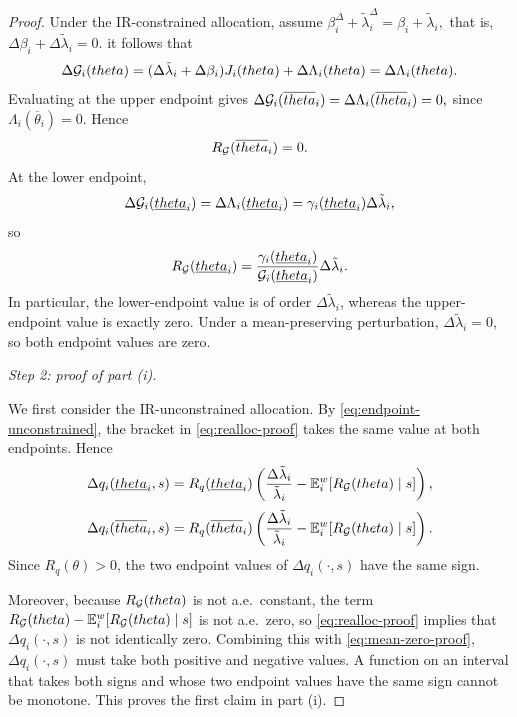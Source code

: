 \documentclass{class}
\begin{document}
\begin{proof}
Under the IR-constrained allocation, assume
$\beta_i^\Delta+\tilde\lambda_i^\Delta=\beta_i+\tilde\lambda_i,$
that is,
$\Delta\beta_i+\Delta\tilde\lambda_i=0.$
it follows that
\[
\Delta\mathcal{G}_i(theta)
=
(\Delta\tilde\lambda_i+\Delta\beta_i)J_i(theta)+\Delta\Lambda_i(theta)
=
\Delta\Lambda_i(theta).
\]
Evaluating at the upper endpoint gives
$\Delta\mathcal{G}_i(\overline{theta}_i) = \Delta\Lambda_i(\overline{theta}_i) = 0,$
since $\Lambda_i(\overline\theta_i)=0$. Hence
\begin{equation}\label{eq:upper-constrained}
R_{\mathcal{G}}(\overline{theta}_i)=0.
\end{equation}
At the lower endpoint,
\[
\Delta\mathcal{G}_i(\underline{theta}_i)
=
\Delta\Lambda_i(\underline{theta}_i)
=
\gamma_i(\underline{theta}_i)\Delta\tilde\lambda_i,
\]
so
\begin{equation}\label{eq:lower-constrained}
R_{\mathcal{G}}(\underline{theta}_i)
=
\frac{\gamma_i(\underline{theta}_i)}{\mathcal{G}_i(\underline{theta}_i)}\Delta\tilde\lambda_i.
\end{equation}
In particular, the lower-endpoint value is of order $\Delta\tilde\lambda_i$, whereas the upper-endpoint value is exactly zero. Under a mean-preserving perturbation, $\Delta\tilde\lambda_i=0$, so both endpoint values are zero.


\noindent\textit{Step 2: proof of part (i).}

We first consider the IR-unconstrained allocation. By \ref{eq:endpoint-unconstrained}, the bracket in \ref{eq:realloc-proof} takes the same value at both endpoints. Hence
\[
\Delta q_i(\underline{theta}_i,s)
=
R_q(\underline{theta}_i)
\left(
\frac{\Delta\tilde\lambda_i}{\tilde\lambda_i}
-
\mathbb{E}_i^w[R_{\mathcal{G}}(theta)\mid s]
\right),
\]
\[
\Delta q_i(\overline{theta}_i,s)
=
R_q(\overline{theta}_i)
\left(
\frac{\Delta\tilde\lambda_i}{\tilde\lambda_i}
-
\mathbb{E}_i^w[R_{\mathcal{G}}(theta)\mid s]
\right).
\]
Since $R_q(\theta)>0$, the two endpoint values of $\Delta q_i(\cdot,s)$ have the same sign.

Moreover, because $R_{\mathcal{G}}(theta)$ is not a.e.\ constant, the term
$R_{\mathcal{G}}(theta)-\mathbb{E}_i^w[R_{\mathcal{G}}(theta)\mid s]$
is not a.e.\ zero, so \ref{eq:realloc-proof} implies that $\Delta q_i(\cdot,s)$ is not identically zero. Combining this with \ref{eq:mean-zero-proof}, $\Delta q_i(\cdot,s)$ must take both positive and negative values. A function on an interval that takes both signs and whose two endpoint values have the same sign cannot be monotone. This proves the first claim in part (i).


\end{proof}
\end{document}
